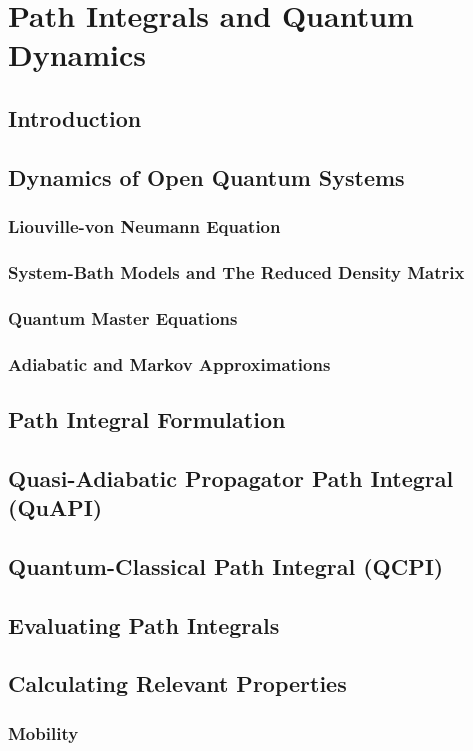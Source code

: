 
\chapter{Path Integrals and Quantum Dynamics} %

\label{Chapter4} %



\section{Introduction}

\section{Dynamics of Open Quantum Systems}

\subsection{Liouville-von Neumann Equation}

\subsection{System-Bath Models and The Reduced Density Matrix}

\subsection{Quantum Master Equations}

\subsection{Adiabatic and Markov Approximations}


\section{Path Integral Formulation}

\section{Quasi-Adiabatic Propagator Path Integral (QuAPI)}

\section{Quantum-Classical Path Integral (QCPI)}

\section{Evaluating Path Integrals}

\section{Calculating Relevant Properties}

\subsection{Mobility}

